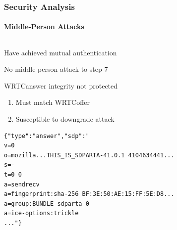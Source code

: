 \documentclass[handout, notes=hide]{beamer}
\begin{document}


\begin{frame}[fragile]
\frametitle{Security Analysis}
\framesubtitle{Middle-Person Attacks}

\begin{columns}[T]
\begin{column}[T]{0.6\textwidth}
\setlength{\parskip}{0.5em}
Have achieved mutual authentication

No middle-person attack to step 7

WRTCanswer integrity not protected
\begin{enumerate}
\item Must match WRTCoffer
\item Susceptible to downgrade attack
\end{enumerate}
\setlength{\fboxrule}{10.0em}
\begin{snugshade}
\begin{tiny}
\begin{verbatim}{"type":"answer","sdp":"
v=0
o=mozilla...THIS_IS_SDPARTA-41.0.1 4104634441...
s=-
t=0 0
a=sendrecv
a=fingerprint:sha-256 BF:3E:50:AE:15:FF:5E:D8...
a=group:BUNDLE sdparta_0
a=ice-options:trickle
..."}
\end{verbatim}
\end{tiny}
\end{snugshade}


\end{column}
\end{columns}
\end{frame}
\end{document}
